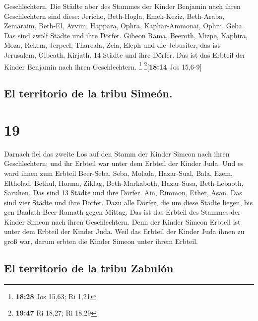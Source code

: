 Geschlechtern.  Die Städte aber des Stammes der Kinder
Benjamin nach ihren Geschlechtern sind diese: Jericho, Beth-Hogla,
Emek-Keziz,  Beth-Araba, Zemaraim, Beth-El,
 Avvim, Happara, Ophra,  Kaphar-Ammonai,
Ophni, Geba. Das sind zwölf Städte und ihre Dörfer. 
Gibeon Rama, Beeroth,  Mizpe, Kaphira, Moza,
 Rekem, Jerpeel, Thareala,  Zela, Eleph
und die Jebusiter, das ist Jerusalem, Gibeath, Kirjath. 14 Städte und
ihre Dörfer. Das ist das Erbteil der Kinder Benjamin nach ihren
Geschlechtern. \footnote{\textbf{18:28} Jos 15,63; Ri 1,21}
\footnote{\textbf{19:47} Ri 18,27; Ri 18,29}{[}\textbf{18:14} Jos
15,6-9{]}

\hypertarget{el-territorio-de-la-tribu-simeuxf3n.}{%
\subsection{El territorio de la tribu
Simeón.}\label{el-territorio-de-la-tribu-simeuxf3n.}}

\hypertarget{section-18}{%
\section{19}\label{section-18}}

 Darnach fiel das zweite Los auf den Stamm der Kinder
Simeon nach ihren Geschlechtern; und ihr Erbteil war unter dem Erbteil
der Kinder Juda.  Und es ward ihnen zum Erbteil Beer-Seba,
Seba, Molada,  Hazar-Sual, Bala, Ezem, 
Eltholad, Bethul, Horma,  Ziklag, Beth-Markaboth,
Hazar-Susa,  Beth-Lebaoth, Saruhen. Das sind 13 Städte und
ihre Dörfer.  Ain, Rimmon, Ether, Asan. Das sind vier
Städte und ihre Dörfer.  Dazu alle Dörfer, die um diese
Städte liegen, bis gen Baalath-Beer-Ramath gegen Mittag. Das ist das
Erbteil des Stammes der Kinder Simeon nach ihren Geschlechtern.
 Denn der Kinder Simeon Erbteil ist unter dem Erbteil der
Kinder Juda. Weil das Erbteil der Kinder Juda ihnen zu groß war, darum
erbten die Kinder Simeon unter ihrem Erbteil.

\hypertarget{el-territorio-de-la-tribu-zabuluxf3n}{%
\subsection{El territorio de la tribu
Zabulón}\label{el-territorio-de-la-tribu-zabuluxf3n}}

